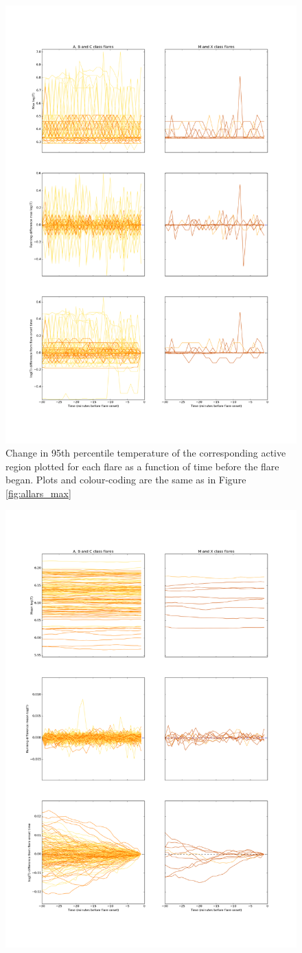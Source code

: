 \documentclass[referee,a4paper,12pt,traditabstract]{swsc}
\begin{document}
\begin{linenumbers}
\begin{figure}
		\includegraphics[width=0.7\columnwidth]{tempplotsmax/allars.png}
	\caption{Change in 95th percentile temperature of the corresponding active region plotted for each flare as a function of time before the flare began. Plots and colour-coding are the same as in Figure \ref{fig:allars_max}}
	\label{fig:allars_p95}
\end{figure}
\begin{figure}
	\centering
		\includegraphics[width=0.7\columnwidth]{tempplotsmean/allars.png}

\end{figure}
\end{linenumbers}
\end{document}
